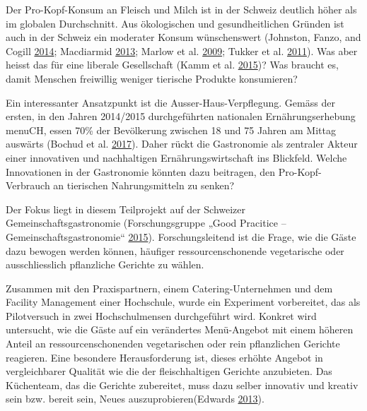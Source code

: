 \documentclass[]{book}
\begin{document}
Der Pro-Kopf-Konsum an Fleisch und Milch ist in der Schweiz deutlich
höher als im globalen Durchschnitt. Aus ökologischen und
gesundheitlichen Gründen ist auch in der Schweiz ein moderater Konsum
wünschenswert (Johnston, Fanzo, and Cogill
\protect\hyperlink{ref-johnston_understanding_2014}{2014}; Macdiarmid
\protect\hyperlink{ref-macdiarmid_is_2013}{2013}; Marlow et al.
\protect\hyperlink{ref-marlow_diet_2009}{2009}; Tukker et al.
\protect\hyperlink{ref-tukker_environmental_2011}{2011}). Was aber
heisst das für eine liberale Gesellschaft (Kamm et al.
\protect\hyperlink{ref-kamm_ernahrung_2015}{2015})? Was braucht es,
damit Menschen freiwillig weniger tierische Produkte konsumieren?

Ein interessanter Ansatzpunkt ist die Ausser-Haus-Verpflegung. Gemäss
der ersten, in den Jahren 2014/2015 durchgeführten nationalen
Ernährungserhebung menuCH, essen 70\% der Bevölkerung zwischen 18 und 75
Jahren am Mittag auswärts (Bochud et al.
\protect\hyperlink{ref-bochud_anthropometric_2017}{2017}). Daher rückt
die Gastronomie als zentraler Akteur einer innovativen und nachhaltigen
Ernährungswirtschaft ins Blickfeld. Welche Innovationen in der
Gastronomie könnten dazu beitragen, den Pro-Kopf-Verbrauch an tierischen
Nahrungsmitteln zu senken?

Der Fokus liegt in diesem Teilprojekt auf der Schweizer
Gemeinschaftsgastronomie (Forschungsgruppe „Good Pracitice --
Gemeinschaftsgastronomie``
\protect\hyperlink{ref-forschungsgruppe_good_pracitice__gemeinschaftsgastronomie_schweizer_2015}{2015}).
Forschungsleitend ist die Frage, wie die Gäste dazu bewogen werden
können, häufiger ressourcenschonende vegetarische oder ausschliesslich
pflanzliche Gerichte zu wählen.

Zusammen mit den Praxispartnern, einem Catering-Unternehmen und dem
Facility Management einer Hochschule, wurde ein Experiment vorbereitet,
das als Pilotversuch in zwei Hochschulmensen durchgeführt wird. Konkret
wird untersucht, wie die Gäste auf ein verändertes Menü-Angebot mit
einem höheren Anteil an ressourcenschonenden vegetarischen oder rein
pflanzlichen Gerichte reagieren. Eine besondere Herausforderung ist,
dieses erhöhte Angebot in vergleichbarer Qualität wie die der
fleischhaltigen Gerichte anzubieten. Das Küchenteam, das die Gerichte
zubereitet, muss dazu selber innovativ und kreativ sein bzw. bereit
sein, Neues auszuprobieren(Edwards
\protect\hyperlink{ref-edwards_foodservice_2013}{2013}).
\end{document}
